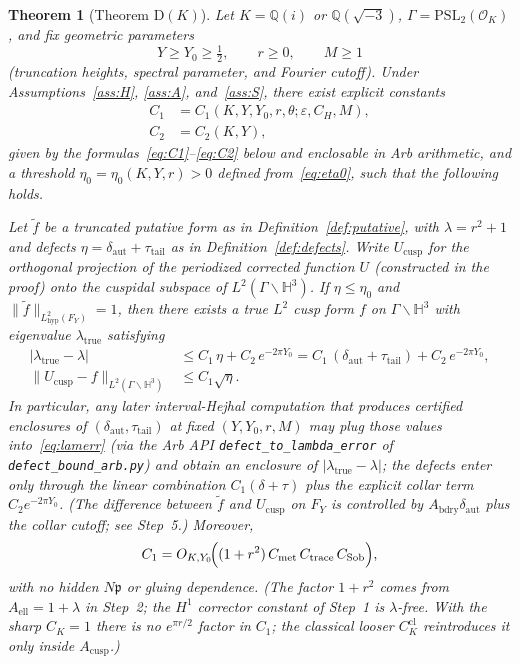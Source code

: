 \documentclass[11pt]{amsart}
\newtheorem{theorem}{Theorem}[section]
\theoremstyle{definition}
\newcommand{\HH}{\mathbb{H}^3}
\newcommand{\QQ}{\mathbb{Q}}
\newcommand{\PSL}{\mathrm{PSL}}
\newcommand{\OK}{\mathcal{O}_K}
\newcommand{\abs}[1]{\lvert#1\rvert}
\newcommand{\norm}[1]{\lVert#1\rVert}
\newcommand{\eps}{\varepsilon}
\newcommand{\tht}{\theta}
\begin{document}
\begin{theorem}[Theorem D$(K)$]
\label{thm:DK}
Let $K=\QQ(i)$ or $\QQ(\sqrt{-3})$, $\Gamma=\PSL_2(\OK)$, and fix
geometric parameters
\[
  Y\ge Y_0\ge \tfrac12,\qquad r\ge 0,\qquad M\ge 1
\]
(truncation heights, spectral parameter, and Fourier cutoff).  Under
Assumptions~\ref{ass:H}, \ref{ass:A}, and~\ref{ass:S}, there exist explicit
constants
\begin{align}
  C_1 &= C_1(K,Y,Y_0,r,\tht;\eps,C_H,M),
  \label{eq:C1name}\\
  C_2 &= C_2(K,Y),
  \label{eq:C2name}
\end{align}
given by the formulas~\eqref{eq:C1}--\eqref{eq:C2} below and enclosable in
Arb arithmetic, and a threshold $\eta_0=\eta_0(K,Y,r)>0$ defined
from~\eqref{eq:eta0}, such that the following holds.

Let $\widetilde f$ be a truncated putative form as in
Definition~\ref{def:putative}, with $\lambda=r^2+1$ and defects
$\eta=\delta_{\mathrm{aut}}+\tau_{\mathrm{tail}}$ as in
Definition~\ref{def:defects}.  Write $U_{\mathrm{cusp}}$ for the
orthogonal projection of the periodized corrected function $U$
(constructed in the proof) onto the cuspidal subspace of
$L^2(\Gamma\backslash\HH)$.  If $\eta\le\eta_0$ and
$\norm{\widetilde f}_{L^2_{\mathrm{hyp}}(F_Y)}=1$, then there exists a true
$L^2$ cusp form $f$ on $\Gamma\backslash\HH$ with eigenvalue
$\lambda_{\mathrm{true}}$ satisfying
\begin{align}
  \abs{\lambda_{\mathrm{true}}-\lambda}
  &\le
  C_1\,\eta
  +
  C_2\,e^{-2\pi Y_0}
  =
  C_1\,(\delta_{\mathrm{aut}}+\tau_{\mathrm{tail}})
  +
  C_2\,e^{-2\pi Y_0},
  \label{eq:lamerr}\\
  \norm{U_{\mathrm{cusp}}-f}_{L^2(\Gamma\backslash\HH)}
  &\le
  C_1\sqrt{\eta}.
  \label{eq:L2err}
\end{align}
In particular, any later interval-Hejhal computation that produces certified
enclosures of $(\delta_{\mathrm{aut}},\tau_{\mathrm{tail}})$ at fixed
$(Y,Y_0,r,M)$ may plug those values into~\eqref{eq:lamerr} (via the Arb
API \texttt{defect\_to\_lambda\_error} of \texttt{defect\_bound\_arb.py})
and obtain an enclosure of $\abs{\lambda_{\mathrm{true}}-\lambda}$; the
defects enter only through the linear combination $C_1(\delta+\tau)$ plus
the explicit collar term $C_2 e^{-2\pi Y_0}$.
(The difference between $\widetilde f$ and $U_{\mathrm{cusp}}$ on $F_Y$ is
controlled by $A_{\mathrm{bdry}}\delta_{\mathrm{aut}}$ plus the collar
cutoff; see Step~5.)  Moreover,
\begin{equation}
\label{eq:C1order}
  C_1
  =
  O_{K,Y_0}\!\Bigl(
    (1+r^{2})\,
    C_{\mathrm{met}}\,
    C_{\mathrm{trace}}\,
    C_{\mathrm{Sob}}
  \Bigr),
\end{equation}
with no hidden $N\mathfrak{p}$ or gluing dependence.  (The factor $1+r^{2}$
comes from $A_{\mathrm{ell}}=1+\lambda$ in Step~2; the $H^1$ corrector
constant of Step~1 is $\lambda$-free.  With the sharp $C_K=1$ there is no
$e^{\pi r/2}$ factor in $C_1$; the classical looser $C_K^{\mathrm{cl}}$
reintroduces it only inside $A_{\mathrm{cusp}}$.)
\end{theorem}
\end{document}
